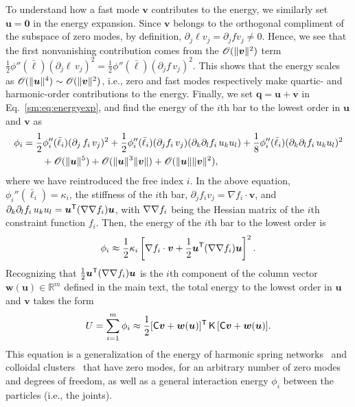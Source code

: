 To understand how a fast mode $\bm{v}$ contributes to the energy, we similarly set $\bm{u} = \bm{0}$ in the energy expansion.
Since $\bm{v}$ belongs to the orthogonal compliment of the subspace of zero modes, by definition, $\partial_j \ell v_j = \partial_j f v_j \ne 0$.
Hence, we see that the first nonvanishing contribution comes from the $\mathscr{O}(\lVert\bm{v}\rVert^2)$ term $\frac{1}{2}\phi''(\bar{\ell})(\partial_j \ell\, v_j)^2 = \frac{1}{2}\phi''(\bar{\ell})(\partial_j f\, v_j)^2$.
This shows that the energy scales as $\mathscr{O}(\lVert\bm{u}\rVert^4) \sim \mathscr{O}(\lVert\bm{v}\rVert^2)$, i.e., zero and fast modes respectively make quartic- and harmonic-order contributions to the energy.
Finally, we set $\bm{q} = \bm{u} + \bm{v}$ in Eq.~\eqref{sm:eq:energyexp}, and find the energy of the $i$th bar to the lowest order in $\bm{u}$ and $\bm{v}$ as
%
\begin{equation}
  \begin{aligned}
    \phi_i &= \frac{1}{2}\phi_i''(\bar{\ell}_i)(\partial_j\, f_i\, v_j)^2 + \frac{1}{2}\phi''_i(\bar{\ell}_i)(\partial_j f_i\, v_j)(\partial_k \partial_l f_i\, u_k u_l) + \frac{1}{8}\phi''_i(\bar{\ell}_i)(\partial_k \partial_l f_i\, u_k u_l)^2\\
           &\qquad+ \mathscr{O}(\lVert\bm{u}\rVert^5) + \mathscr{O}(\lVert\bm{u}\rVert^{3}\lVert\bm{v}\rVert) +\mathscr{O}(\lVert\bm{u}\rVert\lVert\bm{v}\rVert^{2}),
  \end{aligned}
\end{equation}
%
where we have reintroduced the free index $i$.
In the above equation, $\phi_{i}''(\bar{\ell}_i) = \kappa_i$, the stiffness of the $i$th bar, $\partial_j f_i v_j = \nabla f_i\cdot\bm{v}$, and $\partial_k\partial_l f_i\, u_k u_l = \bm{u}^\mathsf{T}(\nabla\nabla f_i)\bm{u}$, with $\nabla\nabla f_i$ being the Hessian matrix of the $i$th constraint function $f_i$.
Then, the energy of the $i$th bar to the lowest order is
%
\begin{equation}
  \phi_i \approx \frac{1}{2}\kappa_i \left[\nabla f_i\cdot\bm{v} + \frac{1}{2}\bm{u}^\mathsf{T}(\nabla\nabla f_i)\bm{u}\right]^2.
\end{equation}
%
Recognizing that $\frac{1}{2}\bm{u}^\mathsf{T}(\nabla\nabla f_{i})\bm{u}$ is the $i$th component of the column vector $\bm{w}(\bm{u}) \in \mathbb{R}^{m}$ defined in the main text, the total energy to the lowest order in $\bm{u}$ and $\bm{v}$ takes the form
%
\begin{equation}
  U = \sum_{i=1}^m \phi_i \approx \frac{1}{2} [\mathsf{C}\bm{v} + \bm{w}(\bm{u})]^\mathsf{T}\,\mathsf{K}\,[\mathsf{C}\bm{v} + \bm{w}(\bm{u})].
\end{equation}
%
This equation is a generalization of the energy of harmonic spring networks~\cite{zhang2016,woodhouse2018} and colloidal clusters~\cite{kallus2017} that have zero modes, for an arbitrary number of zero modes and degrees of freedom, as well as a general interaction energy $\phi_{i}$ between the particles (i.e., the joints).

